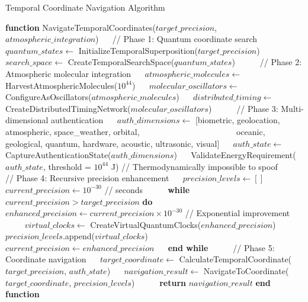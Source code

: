 \documentclass[12pt,a4paper]{article}
\theoremstyle{definition}
\begin{document}
{\begin{algorithm}
\caption{Temporal Coordinate Navigation Algorithm}
\begin{algorithmic}[1]
\STATE \textbf{function} NavigateTemporalCoordinates($target\_precision$, $atmospheric\_integration$)
\STATE $\quad$ // Phase 1: Quantum coordinate search
\STATE $\quad$ $quantum\_states \leftarrow$ InitializeTemporalSuperposition($target\_precision$)
\STATE $\quad$ $search\_space \leftarrow$ CreateTemporalSearchSpace($quantum\_states$)
\STATE $\quad$
\STATE $\quad$ // Phase 2: Atmospheric molecular integration
\STATE $\quad$ $atmospheric\_molecules \leftarrow$ HarvestAtmosphericMolecules($10^{44}$)
\STATE $\quad$ $molecular\_oscillators \leftarrow$ ConfigureAsOscillators($atmospheric\_molecules$)
\STATE $\quad$ $distributed\_timing \leftarrow$ CreateDistributedTimingNetwork($molecular\_oscillators$)
\STATE $\quad$
\STATE $\quad$ // Phase 3: Multi-dimensional authentication
\STATE $\quad$ $auth\_dimensions \leftarrow$ [biometric, geolocation, atmospheric, space\_weather, orbital,
\STATE $\quad\quad\quad\quad\quad\quad\quad\quad\quad\quad\quad$ oceanic, geological, quantum, hardware, acoustic, ultrasonic, visual]
\STATE $\quad$ $auth\_state \leftarrow$ CaptureAuthenticationState($auth\_dimensions$)
\STATE $\quad$ ValidateEnergyRequirement($auth\_state$, threshold = $10^{44}$ J) // Thermodynamically impossible to spoof
\STATE $\quad$
\STATE $\quad$ // Phase 4: Recursive precision enhancement
\STATE $\quad$ $precision\_levels \leftarrow []$
\STATE $\quad$ $current\_precision \leftarrow 10^{-30}$ // seconds
\STATE $\quad$
\STATE $\quad$ \textbf{while} $current\_precision > target\_precision$ \textbf{do}
\STATE $\quad\quad$ $enhanced\_precision \leftarrow current\_precision \times 10^{-30}$ // Exponential improvement
\STATE $\quad\quad$ $virtual\_clocks \leftarrow$ CreateVirtualQuantumClocks($enhanced\_precision$)
\STATE $\quad\quad$ $precision\_levels$.append($virtual\_clocks$)
\STATE $\quad\quad$ $current\_precision \leftarrow enhanced\_precision$
\STATE $\quad$ \textbf{end while}
\STATE $\quad$
\STATE $\quad$ // Phase 5: Coordinate navigation
\STATE $\quad$ $target\_coordinate \leftarrow$ CalculateTemporalCoordinate($target\_precision$, $auth\_state$)
\STATE $\quad$ $navigation\_result \leftarrow$ NavigateToCoordinate($target\_coordinate$, $precision\_levels$)
\STATE $\quad$
\STATE $\quad$ \textbf{return} $navigation\_result$
\STATE \textbf{end function}
\end{algorithmic}
\end{algorithm}

}
\end{document}
